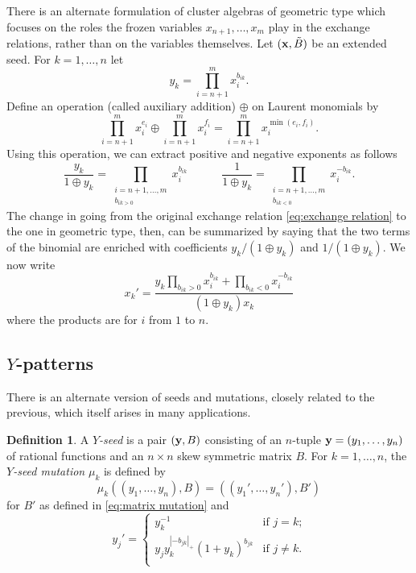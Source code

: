 \documentclass{amsart}
\theoremstyle{definition}
\newtheorem{definition}[theorem]{Definition}
\theoremstyle{remark}
\numberwithin{equation}{section}
\newcommand{\x}{{\bf x}}
\newcommand{\y}{{\bf y}}
\begin{document}
	There is an alternate formulation of cluster algebras of geometric type which focuses on the roles the frozen variables $x_{n+1},\ldots, x_m$ play in the exchange relations, rather than on the variables themselves.  Let $(\x, \tilde{B})$ be an extended seed.  For $k=1,\ldots, n$ let 
	\begin{displaymath}
	y_k = \prod_{i=n+1}^m x_i^{b_{ik}}.
	\end{displaymath}
	Define an operation (called auxiliary addition) $\oplus$ on Laurent monomials by
	\begin{displaymath}
	\prod_{i=n+1}^m x_i^{e_i} \oplus \prod_{i=n+1}^m x_i^{f_i} = \prod_{i=n+1}^m x_i^{\min(e_i,f_i)}.
	\end{displaymath}
	Using this operation, we can extract positive and negative exponents as follows
	\begin{displaymath}
	\frac{y_k}{1 \oplus y_k} = \prod_{\substack{i=n+1,\ldots, m\\ b_{ik > 0}}} x_i^{b_{ik}}
	\quad \quad \quad \frac{1}{1 \oplus y_k} = \prod_{\substack{i=n+1,\ldots, m\\ b_{ik < 0}}} x_i^{-b_{ik}}.
	\end{displaymath}
	The change in going from the original exchange relation \eqref{eq:exchange relation} to the one in geometric type, then, can be summarized by saying that the two terms of the binomial are enriched with coefficients $y_k/(1 \oplus y_k)$ and $1/(1 \oplus y_k)$.  We now write
	\begin{displaymath} 
		x_k' = \frac{y_k\prod_{b_{ik}>0} x_i^{b_{ik}} + \prod_{b_{ik}<0} x_i^{-b_{ik}}}{(1 \oplus y_k)x_k}
	\end{displaymath}
	where the products are for $i$ from $1$ to $n$.
	
	\subsection{$Y$-patterns}
	There is an alternate version of seeds and mutations, closely related to the previous, which itself arises in many applications.  
	
	\begin{definition}
		A \emph{$Y$-seed} is a pair $(\y,B)$ consisting of an $n$-tuple $\y=(y_1,\ldots, y_n)$ of rational functions and an $n\times n$ skew symmetric matrix $B$.  For $k=1,\ldots, n$, the \emph{$Y$-seed mutation} $\mu_k$ is defined by
		\begin{displaymath}
			\mu_k((y_1,\ldots, y_n),B) = ((y_1',\ldots, y_n'),B')
		\end{displaymath}
		for $B'$ as defined in \eqref{eq:matrix mutation} and 
		\begin{equation}\label{eq:y mutation}
		y_j' = \begin{cases}
		y_k^{-1} & \text{if $j = k$;} \\
		y_jy_k^{|-b_{jk}|_+}(1+y_k)^{b_{jk}} & \text{if $j \neq k$.} \\
		\end{cases}
		\end{equation}
	\end{definition}
	
\end{document}
